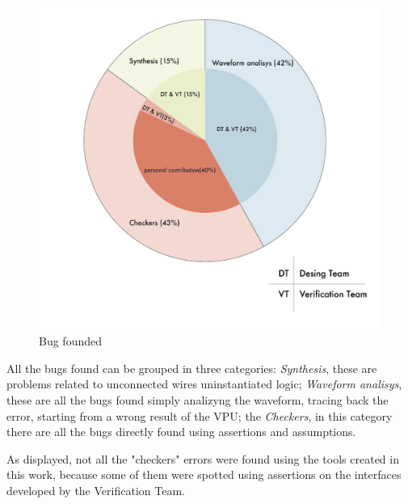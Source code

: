 \begin{figure}[H]
    \centering
    \includegraphics[scale = 0.7]{Chapter_3/img/torta.png}
    \caption{Bug founded}
    \label{torta}
\end{figure}

All the bugs found can be grouped in three categories: \emph{Synthesis}, these are problems related to unconnected wires uninstantiated logic; \emph{Waveform analisys}, these are all the bugs found simply analizyng the waveform, tracing back  the error, starting from a wrong result of the VPU; the \emph{Checkers}, in this category there are all the bugs directly found using assertions and assumptions.

As displayed, not all the "checkers" errors were found using the tools created in this work, because some of them were spotted using assertions on the interfaces developed by the Verification Team.



